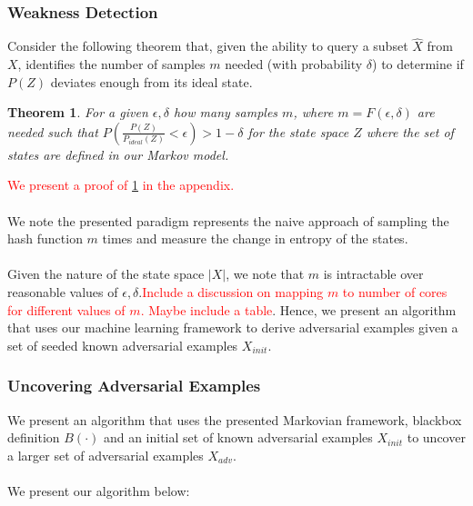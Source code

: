 \documentclass[letterpaper,twocolumn,10pt]{article}
\newtheorem{theorem}{Theorem}
\begin{document}
\subsubsection{Weakness Detection}
Consider the following theorem that, given the ability to query a subset $\hat{X}$ from $X$, identifies the number of samples $m$ needed (with probability $\delta$) to determine if $P(Z)$ deviates enough from its ideal state. 

\begin{theorem}
\label{mainThm}
For a given $\epsilon, \delta$ how many samples $m$, where $m = F(\epsilon, \delta)$ are needed such that $P(\frac{P(Z)}{P_{ideal}(Z)}< \epsilon) > 1 - \delta$ for the state space $Z$ where the set of states are defined in our Markov model. 
\end{theorem}

\textcolor{red}{We present a proof of \ref{mainThm} in the appendix.}
\\
\\
We note the presented paradigm represents the naive approach of sampling the hash function $m$ times and measure the change in entropy of the states. 
\\
\\
Given the nature of the state space $|X|$, we note that $m$ is intractable over reasonable values of $\epsilon, \delta$.\textcolor{red}{Include a discussion on mapping $m$ to number of cores for different values of $m$. Maybe include a table}. Hence, we present an algorithm that uses our machine learning framework to derive adversarial examples given a set of seeded known adversarial examples $X_{init}$. 


\subsubsection{Uncovering Adversarial Examples}
We present an algorithm that uses the presented Markovian framework, blackbox definition $B(\cdot)$ and an initial set of known adversarial examples $X_{init}$ to uncover a larger set of adversarial examples $X_{adv}$. 
\\
\\
We present our algorithm below:
\end{document}
